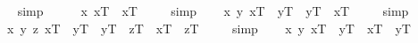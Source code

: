 \begin{isabellebody}
\isadelimproof
\ %
\endisadelimproof
%
\isatagproof
{}\isamarkupfalse%
\ simp\ \isamarkupfalse%
%
\endisatagproof
{\isafoldproof}%
%
\isadelimproof
%
\endisadelimproof
\ \isanewline
\isanewline
\ \isamarkupfalse%
\ {\isachardoublequoteopen}{\isacharbrackleft}{\isacharparenleft}\isactrlbold {\isasymforall}x{\isachardot}\ x\isactrlsup T\ \isactrlbold {\isacharequal}\ x\isactrlsup T{\isacharparenright}{\isacharbrackright}\ {\isacharequal}\ {\isasymtop}{\isachardoublequoteclose}%
\isadelimproof
\ %
\endisadelimproof
%
\isatagproof
{}\isamarkupfalse%
\ simp\ \isamarkupfalse%
%
\endisatagproof
{\isafoldproof}%
%
\isadelimproof
%
\endisadelimproof
\isanewline
\ \isamarkupfalse%
\ {\isachardoublequoteopen}{\isacharbrackleft}{\isacharparenleft}\isactrlbold {\isasymforall}x\ y{\isachardot}\ x\isactrlsup T\ \isactrlbold {\isacharequal}\ y\isactrlsup T\ \isactrlbold {\isasymrightarrow}\ y\isactrlsup T\ \isactrlbold {\isacharequal}\ x\isactrlsup T{\isacharparenright}{\isacharbrackright}\ {\isacharequal}\ {\isasymtop}{\isachardoublequoteclose}%
\isadelimproof
\ %
\endisadelimproof
%
\isatagproof
{}\isamarkupfalse%
\ simp\ \isamarkupfalse%
%
\endisatagproof
{\isafoldproof}%
%
\isadelimproof
%
\endisadelimproof
\isanewline
\ \isamarkupfalse%
\ {\isachardoublequoteopen}{\isacharbrackleft}{\isacharparenleft}\isactrlbold {\isasymforall}x\ y\ z{\isachardot}\ {\isacharparenleft}x\isactrlsup T\ \isactrlbold {\isacharequal}\ y\isactrlsup T\ \isactrlbold {\isasymand}\ y\isactrlsup T\ \isactrlbold {\isacharequal}\ z\isactrlsup T{\isacharparenright}\ \isactrlbold {\isasymrightarrow}\ x\isactrlsup T\ \isactrlbold {\isacharequal}\ z\isactrlsup T{\isacharparenright}{\isacharbrackright}\ {\isacharequal}\ {\isasymtop}{\isachardoublequoteclose}%
\isadelimproof
\ %
\endisadelimproof
%
\isatagproof
{}\isamarkupfalse%
\ simp\ \isamarkupfalse%
%
\endisatagproof
{\isafoldproof}%
%
\isadelimproof
%
\endisadelimproof
\isanewline
\ \isamarkupfalse%
\ {\isachardoublequoteopen}{\isacharbrackleft}{\isacharparenleft}\isactrlbold {\isasymforall}x\ y{\isachardot}\ x\isactrlsup T\ \isactrlbold {\isacharequal}\ y\isactrlsup T\ \isactrlbold {\isasymrightarrow}\ \isactrlbold {\isasymbox}{\isacharparenleft}x\isactrlsup T\ \isactrlbold {\isacharequal}\ y\isactrlsup T{\isacharparenright}{\isacharparenright}{\isacharbrackright}\ {\isacharequal}\ {\isasymtop}{\isachardoublequoteclose}%

\end{isabellebody}
